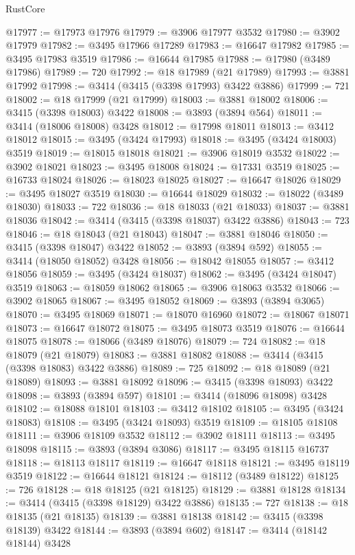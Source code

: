 \begin{lexlean}{RustCore}
\begin{coremodule}
@17977 := @17973 @17976
@17979 := @3906 @17977 @3532
@17980 := @3902 @17979
@17982 := @3495 @17966 @17289
@17983 := @16647 @17982
@17985 := @3495 @17983 @3519
@17986 := @16644 @17985
@17988 := @17980 (@3489 @17986)
@17989 := 720
@17992 := @18 @17989 (@21 @17989)
@17993 := @3881 @17992
@17998 := @3414 (@3415 (@3398 @17993) @3422 @3886)
@17999 := 721
@18002 := @18 @17999 (@21 @17999)
@18003 := @3881 @18002
@18006 := @3415 (@3398 @18003) @3422
@18008 := @3893 (@3894 @564)
@18011 := @3414 (@18006 @18008) @3428
@18012 := @17998 @18011
@18013 := @3412 @18012
@18015 := @3495 (@3424 @17993)
@18018 := @3495 (@3424 @18003) @3519
@18019 := @18015 @18018
@18021 := @3906 @18019 @3532
@18022 := @3902 @18021
@18023 := @3495 @18008
@18024 := @17331 @3519
@18025 := @16733 @18024
@18026 := @18023 @18025
@18027 := @16647 @18026
@18029 := @3495 @18027 @3519
@18030 := @16644 @18029
@18032 := @18022 (@3489 @18030)
@18033 := 722
@18036 := @18 @18033 (@21 @18033)
@18037 := @3881 @18036
@18042 := @3414 (@3415 (@3398 @18037) @3422 @3886)
@18043 := 723
@18046 := @18 @18043 (@21 @18043)
@18047 := @3881 @18046
@18050 := @3415 (@3398 @18047) @3422
@18052 := @3893 (@3894 @592)
@18055 := @3414 (@18050 @18052) @3428
@18056 := @18042 @18055
@18057 := @3412 @18056
@18059 := @3495 (@3424 @18037)
@18062 := @3495 (@3424 @18047) @3519
@18063 := @18059 @18062
@18065 := @3906 @18063 @3532
@18066 := @3902 @18065
@18067 := @3495 @18052
@18069 := @3893 (@3894 @3065)
@18070 := @3495 @18069
@18071 := @18070 @16960
@18072 := @18067 @18071
@18073 := @16647 @18072
@18075 := @3495 @18073 @3519
@18076 := @16644 @18075
@18078 := @18066 (@3489 @18076)
@18079 := 724
@18082 := @18 @18079 (@21 @18079)
@18083 := @3881 @18082
@18088 := @3414 (@3415 (@3398 @18083) @3422 @3886)
@18089 := 725
@18092 := @18 @18089 (@21 @18089)
@18093 := @3881 @18092
@18096 := @3415 (@3398 @18093) @3422
@18098 := @3893 (@3894 @597)
@18101 := @3414 (@18096 @18098) @3428
@18102 := @18088 @18101
@18103 := @3412 @18102
@18105 := @3495 (@3424 @18083)
@18108 := @3495 (@3424 @18093) @3519
@18109 := @18105 @18108
@18111 := @3906 @18109 @3532
@18112 := @3902 @18111
@18113 := @3495 @18098
@18115 := @3893 (@3894 @3086)
@18117 := @3495 @18115 @16737
@18118 := @18113 @18117
@18119 := @16647 @18118
@18121 := @3495 @18119 @3519
@18122 := @16644 @18121
@18124 := @18112 (@3489 @18122)
@18125 := 726
@18128 := @18 @18125 (@21 @18125)
@18129 := @3881 @18128
@18134 := @3414 (@3415 (@3398 @18129) @3422 @3886)
@18135 := 727
@18138 := @18 @18135 (@21 @18135)
@18139 := @3881 @18138
@18142 := @3415 (@3398 @18139) @3422
@18144 := @3893 (@3894 @602)
@18147 := @3414 (@18142 @18144) @3428

\end{coremodule}
\end{lexlean}
